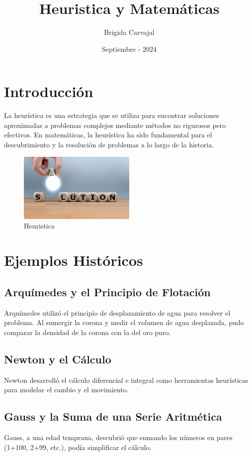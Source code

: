 \documentclass{article}
\title{Heuristica y Matemáticas}
\author{Brigida Carvajal}
\date{Septiembre - 2024}
\begin{document}
\maketitle

\tableofcontents
\newpage
\section{Introducción}
La heurística es una estrategia que se utiliza para encontrar soluciones aproximadas a problemas complejos mediante métodos no rigurosos pero efectivos. En matemáticas, la heurística ha sido fundamental para el descubrimiento y la resolución de problemas a lo largo de la historia.
\begin{figure}[h!]
    \centering
    \includegraphics[width=0.5\textwidth]{th.jpg}
    \caption{Heuristica}
    \label{fig:mi_imagen}
\end{figure}
\section{Ejemplos Históricos}
\subsection{Arquímedes y el Principio de Flotación}
Arquímedes utilizó el principio de desplazamiento de agua para resolver el problema. Al sumergir la corona y medir el volumen de agua desplazada, pudo comparar la densidad de la corona con la del oro puro.
\subsection{Newton y el Cálculo}
Newton desarrolló el cálculo diferencial e integral como herramientas heurísticas para modelar el cambio y el movimiento.
\subsection{Gauss y la Suma de una Serie Aritmética}
Gauss, a una edad temprana, descubrió que sumando los números en pares (1+100, 2+99, etc.), podía simplificar el cálculo.\citep{krick1991algorithm}
\end{document}
